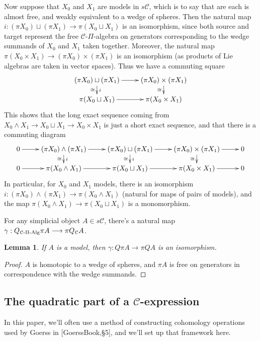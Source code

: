\documentclass[11pt]{amsart}
\theoremstyle{plain}
\newtheorem{lem}[thm]{Lemma}
\theoremstyle{definition}
\renewcommand{\to}{\longrightarrow}
\newcommand{\calC}{\mathcal{C}}
\theoremstyle{plain}
\newcommand{\PiAlg}{\textup{-$\Pi$-Alg}}
\begin{document}
\begin{Conventions and notation}
Now suppose that $X_0$ and $X_1$ are models in $s\calC$, which is to say that are each is almost free, and weakly equivalent to a wedge of spheres. Then the natural map $i:(\pi X_0)\sqcup (\pi X_1)\to \pi(X_0\sqcup X_1)$ is an isomorphism, since both source and target represent the free $\calC$-$\Pi$-algebra on generators corresponding to the wedge summands of $X_0$ and $X_1$ taken together. Moreover, the natural map $\pi(X_0\times X_1)\to (\pi X_0)\times (\pi X_1)$ is an isomorphism (as products of Lie algebras are taken in vector spaces). Thus we have a commuting square
\[\xymatrix@R=4mm{
(\pi X_0)\sqcup (\pi X_1)
\ar[r]
\ar[d]^-{i}_-{\cong}
&%
(\pi X_0)\times (\pi X_1)
\ar[d]_-{\cong}\\
\pi (X_0\sqcup X_1)
\ar[r]
&%
\pi (X_0\times X_1)
}\]
This shows that the long exact sequence coming from $X_0\wedge X_1\to X_0\sqcup X_1\to X_0\times X_1$ is just a short exact sequence, and that there is a commuting diagram
\[\xymatrix@R=4mm{
0\ar[r]&%
(\pi X_0)\wedge (\pi X_1)
\ar[r]
\ar[d]^-{i}_-{\cong}
&%
(\pi X_0)\sqcup (\pi X_1)
\ar[r]
\ar[d]^-{i}_-{\cong}
&%
(\pi X_0)\times (\pi X_1)
\ar[r]
\ar[d]_-{\cong}
&%
0\\%
0\ar[r]&%
\pi (X_0\wedge  X_1)
\ar[r]
&%
\pi (X_0\sqcup X_1)
\ar[r]
&%
\pi (X_0\times X_1)
\ar[r]
&%
0
}\]
In particular, for $X_0$ and $X_1$ models, there is an isomorphism $i:(\pi X_0)\wedge (\pi X_1)\to\pi(X_0\wedge X_1)$ (natural for maps of pairs of models), and the map $\pi(X_0\wedge X_1)\to \pi(X_0\sqcup X_1)$ is a monomorphism.

For any simplicial object $A\in s\calC$, there's a natural map $\gamma:Q_{\calC\PiAlg}\pi A\to \pi Q_{\calC}A$.
\begin{lem}
If $A$ is a model, then $\gamma:Q\pi A\to \pi QA$ is an isomorphism.
\end{lem}
\begin{proof}
$A$ is homotopic to a wedge of spheres, and $\pi A$ is free on generators in correspondence with the wedge summands.
\end{proof}

\subsection{The quadratic part of a $\calC$-expression}\label{quadratic part section}
In this paper, we'll often use a method of constructing cohomology operations used by Goerss in [GoerssBook,\S5], and we'll set up that framework here.


\end{Conventions and notation}
\end{document}
